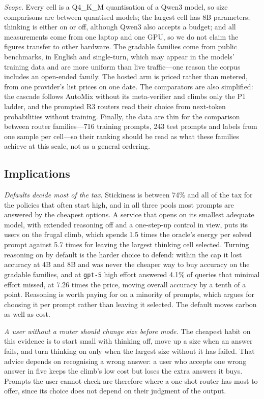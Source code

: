 \emph{Scope.} Every cell is a Q4\_K\_M quantisation of a Qwen3 model, so size
comparisons are between quantised models; the largest cell has 8B parameters;
thinking is either on or off, although Qwen3 also accepts a budget; and all
measurements come from one laptop and one GPU, so we do not claim the figures
transfer to other hardware. The gradable families come from public
benchmarks, in English and single-turn, which may appear in the models'
training data and are more uniform than live traffic---one reason the corpus
includes an open-ended family. The hosted arm is priced rather than metered,
from one provider's list prices on one date. The comparators are also
simplified: the cascade follows AutoMix without its meta-verifier and climbs
only the P1 ladder, and the prompted R3 routers read their choice from
next-token probabilities without training. Finally, the data are thin for the
comparison between router families---716 training prompts, 243 test prompts
and labels from one sample per cell---so their ranking should be read as what
these families achieve at this scale, not as a general ordering.

\subsection{Implications}
\label{sec:implications}

\emph{Defaults decide most of the tax.} Stickiness is between 74\% and all of
the tax for the policies that often start high, and in all three pools most
prompts are answered by the cheapest options. A service that opens on its
smallest adequate model, with extended reasoning off and a one-step-up
control in view, puts its users on the frugal climb, which spends 1.5 times
the oracle's energy per solved prompt against 5.7 times for leaving the
largest thinking cell selected. Turning reasoning on by default is the harder
choice to defend: within the cap it lost accuracy at 4B and 8B and was never
the cheaper way to buy accuracy on the gradable families, and at
\texttt{gpt-5} high effort answered 4.1\% of queries that minimal effort
missed, at 7.26 times the price, moving overall accuracy by a tenth of a
point. Reasoning is worth paying for on a minority of prompts, which argues
for choosing it per prompt rather than leaving it selected. The default moves
carbon as well as cost.

\emph{A user without a router should change size before mode.} The cheapest
habit on this evidence is to start small with thinking off, move up a size
when an answer fails, and turn thinking on only when the largest size without
it has failed. That advice depends on recognising a wrong answer: a user who
accepts one wrong answer in five keeps the climb's low cost but loses the
extra answers it buys. Prompts the user cannot check are therefore where a
one-shot router has most to offer, since its choice does not depend on their
judgment of the output.

